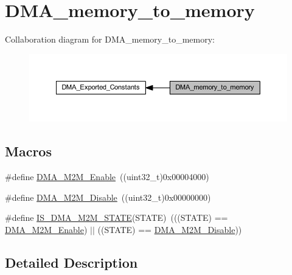 \hypertarget{group___d_m_a__memory__to__memory}{}\section{D\+M\+A\+\_\+memory\+\_\+to\+\_\+memory}
\label{group___d_m_a__memory__to__memory}
Collaboration diagram for D\+M\+A\+\_\+memory\+\_\+to\+\_\+memory\+:
\nopagebreak
\begin{figure}[H]
\begin{center}
\leavevmode
\includegraphics[width=350pt]{group___d_m_a__memory__to__memory}
\end{center}
\end{figure}
\subsection*{Macros}
\begin{DoxyCompactItemize}
\item 
\#define \hyperlink{group___d_m_a__memory__to__memory_ga046a1de15235c254c0511c08cae3065a}{D\+M\+A\+\_\+\+M2\+M\+\_\+\+Enable}~((uint32\+\_\+t)0x00004000)
\item 
\#define \hyperlink{group___d_m_a__memory__to__memory_ga86e0a7076f0badd509fac6576f3b5355}{D\+M\+A\+\_\+\+M2\+M\+\_\+\+Disable}~((uint32\+\_\+t)0x00000000)
\item 
\#define \hyperlink{group___d_m_a__memory__to__memory_gae0241d6265efc45f87b113cf44e50c06}{I\+S\+\_\+\+D\+M\+A\+\_\+\+M2\+M\+\_\+\+S\+T\+A\+TE}(S\+T\+A\+TE)~(((S\+T\+A\+TE) == \hyperlink{group___d_m_a__memory__to__memory_ga046a1de15235c254c0511c08cae3065a}{D\+M\+A\+\_\+\+M2\+M\+\_\+\+Enable}) $\vert$$\vert$ ((S\+T\+A\+TE) == \hyperlink{group___d_m_a__memory__to__memory_ga86e0a7076f0badd509fac6576f3b5355}{D\+M\+A\+\_\+\+M2\+M\+\_\+\+Disable}))
\end{DoxyCompactItemize}


\subsection{Detailed Description}


